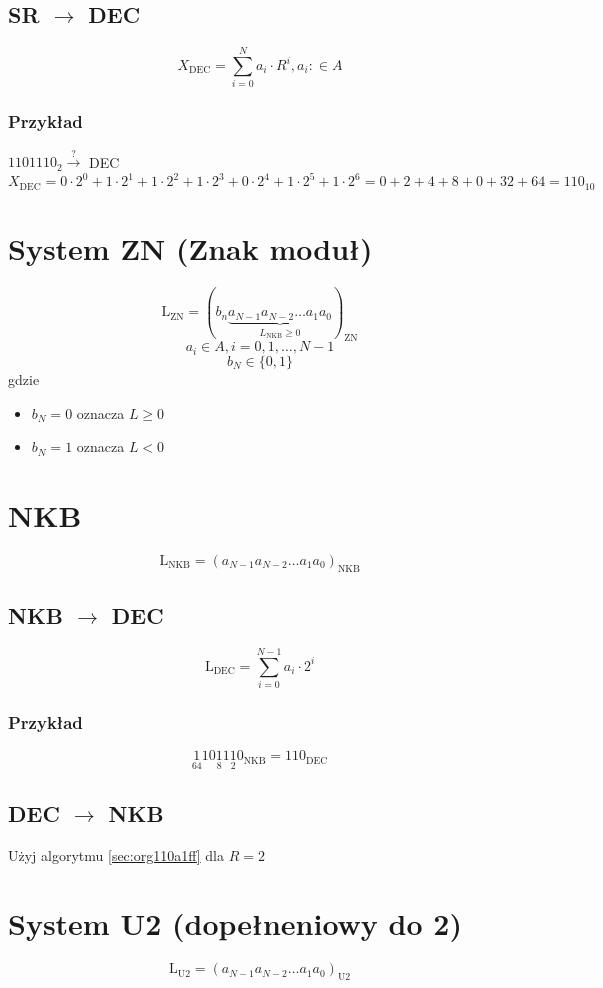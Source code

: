 \documentclass[11pt]{article}
\begin{document}
\subsection{SR \(\to\) DEC}
\label{sec:org2681616}
$$X_{\text{DEC}} = \sum_{i=0}^{N} a_i \cdot R^{i}, a_{i}: \in A$$

\subsubsection{Przykład}
\label{sec:org9a4e022}
\(1101110_{2} \xrightarrow{?}\) DEC
$$X_{\text{DEC}} = 0 \cdot 2^0 + 1 \cdot 2^1 + 1 \cdot 2^2 + 1 \cdot 2^3 + 0 \cdot 2^4 + 1 \cdot 2^5 + 1 \cdot 2^6 = 0 + 2 + 4 + 8 + 0 + 32 + 64 = 110_{10} $$

\section{System ZN (Znak moduł)}
\label{sec:org0165023}
$$\text{L}_{\text{ZN}} = (b_n \underbrace{ a_{N-1} a_{N-2} \dots  a_1 a_0}_{L_{\text{NKB}} \geq 0} )_{\text{ZN}}$$
$$a_i \in A , i=0,1,\dots,N-1$$
$$b_N \in \{0,1\}$$
gdzie
\begin{itemize}
\item \(b_N=0\) oznacza \(L\geq0\)
\item \(b_N=1\) oznacza \(L<0\)
\end{itemize}
\section{NKB}
\label{sec:orge886311}
$$\text{L}_{\text{NKB}}=(a_{N-1}a_{N-2} \dots a_1 a_0)_{\text{NKB}}$$
\subsection{NKB \(\to\) DEC}
\label{sec:org569deb9}
$$\text{L}_{\text{DEC}} = \sum_{i=0}^{N-1} a_i \cdot 2^i $$
\subsubsection{Przykład}
\label{sec:org71af190}
$$\underset{64}{1}10\underset{8}{1}1\underset{2}{1}0_{\text{NKB}} = 110_{\text{DEC}}$$
\subsection{DEC \(\to\) NKB}
\label{sec:org4435383}
Użyj algorytmu \ref{sec:org110a1ff} dla \(R = 2\)
\section{System U2 (dopełneniowy do 2)}
\label{sec:orgbb74f9d}
$$\text{L}_{\text{U2}}=(a_{N-1}a_{N-2} \dots a_1 a_0)_{\text{U2}}$$
\end{document}
